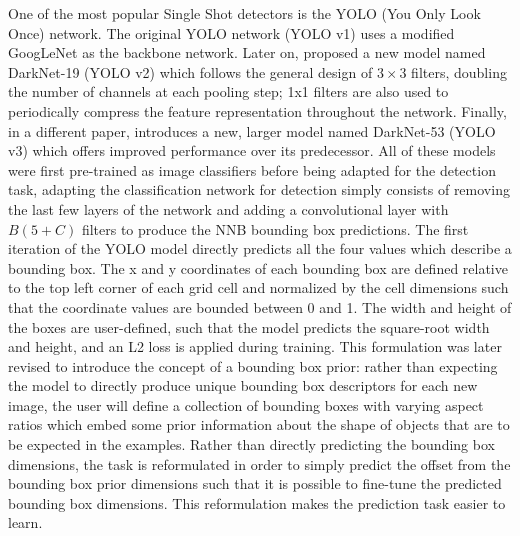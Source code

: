 One of the most popular Single Shot detectors is the YOLO (You Only Look Once) network. The original YOLO network (YOLO v1) \cite{Redmon2015-cy} uses a modified GoogLeNet as the backbone network. Later on, \citeauthor{Redmon2016-ad}\cite{Redmon2016-ad} proposed a new model named DarkNet-19 (YOLO v2) which follows the general design of $3\times3$ filters, doubling the number of channels at each pooling step; 1x1 filters are also used to periodically compress the feature representation throughout the network. Finally, in a different paper, \citeauthor{Redmon_undated-wa}\cite{Redmon_undated-wa} introduces a new, larger model named DarkNet-53 (YOLO v3) which offers improved performance over its predecessor. All of these models were first pre-trained as image classifiers before being adapted for the detection task, adapting the classification network for detection simply consists of removing the last few layers of the network and adding a convolutional layer with $B(5+C)$ filters to produce the NNB bounding box predictions. The first iteration of the YOLO model directly predicts all the four values which describe a bounding box. The x and y coordinates of each bounding box are defined relative to the top left corner of each grid cell and normalized by the cell dimensions such that the coordinate values are bounded between 0 and 1. The width and height of the boxes are user-defined, such that the model predicts the square-root width and height, and an L2 loss is applied during training. This formulation was later revised to introduce the concept of a bounding box prior: rather than expecting the model to directly produce unique bounding box descriptors for each new image, the user will define a collection of bounding boxes with varying aspect ratios which embed some prior information about the shape of objects that are to be expected in the examples. Rather than directly predicting the bounding box dimensions, the task is reformulated in order to simply predict the offset from the bounding box prior dimensions such that it is possible to fine-tune the predicted bounding box dimensions. This reformulation makes the prediction task easier to learn.
